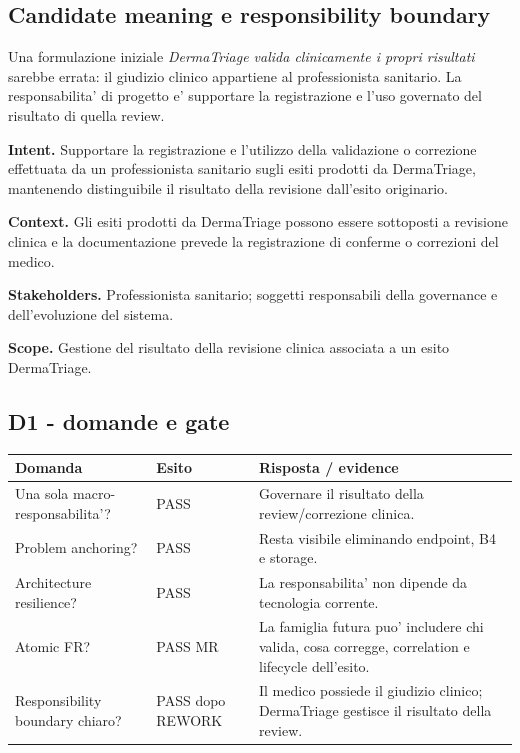 \documentclass[11pt,a4paper]{article}
\begin{document}
\subsection{Candidate meaning e responsibility boundary}

Una formulazione iniziale \emph{DermaTriage valida clinicamente i propri risultati} sarebbe errata: il giudizio clinico appartiene al professionista sanitario. La responsabilita' di progetto e' supportare la registrazione e l'uso governato del risultato di quella review.

\begin{ddtacore}[title={MR-03 - Gestione della validazione clinica degli esiti}]
\textbf{Intent.} Supportare la registrazione e l'utilizzo della validazione o correzione effettuata da un professionista sanitario sugli esiti prodotti da DermaTriage, mantenendo distinguibile il risultato della revisione dall'esito originario.

\textbf{Context.} Gli esiti prodotti da DermaTriage possono essere sottoposti a revisione clinica e la documentazione prevede la registrazione di conferme o correzioni del medico.

\textbf{Stakeholders.} Professionista sanitario; soggetti responsabili della governance e dell'evoluzione del sistema.

\textbf{Scope.} Gestione del risultato della revisione clinica associata a un esito DermaTriage.
\end{ddtacore}

\subsection{D1 - domande e gate}

\begin{tabularx}{\textwidth}{L{61mm}L{21mm}Y}
\toprule
\textbf{Domanda} & \textbf{Esito} & \textbf{Risposta / evidence} \\
\midrule
Una sola macro-responsabilita'? & PASS & Governare il risultato della review/correzione clinica. \\
Problem anchoring? & PASS & Resta visibile eliminando endpoint, B4 e storage. \\
Architecture resilience? & PASS & La responsabilita' non dipende da tecnologia corrente. \\
Atomic FR? & PASS MR & La famiglia futura puo' includere chi valida, cosa corregge, correlation e lifecycle dell'esito. \\
Responsibility boundary chiaro? & PASS dopo REWORK & Il medico possiede il giudizio clinico; DermaTriage gestisce il risultato della review. \\
\bottomrule
\end{tabularx}
\end{document}

